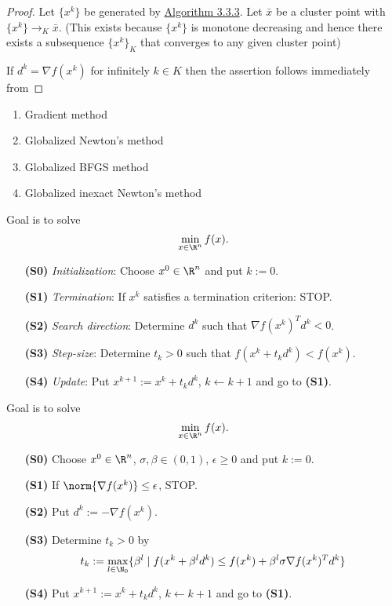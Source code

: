 \begin{proof}

	\def\xk{\{x^k\}}
	\def\grad{\nabla f(x^k)}

	Let $\xk$ be generated by \hyperref[a7a5665]{Algorithm 3.3.3}. Let
	$\bar x$ be a cluster point with $\xk\to_K\bar x$. (This exists
	because $\xk$ is monotone decreasing and hence there exists a
	subsequence $\xk_K$ that converges to any given cluster point)

	If $d^k=\grad$ for infinitely $k\in K$ then the assertion follows immediately from

\end{proof}


\begin{enumerate}
	\item Gradient method
	\item Globalized Newton's method
	\item Globalized BFGS method
	\item Globalized inexact Newton's method
\end{enumerate}


Goal is to solve
$$\min_{x\in\R^n}f(x).$$

\begin{enumerate}
	\item [\textbf{(S0)}] \textit{Initialization}: Choose $x^0\in\R^n$ and put $k:=0$.
	\item [\textbf{(S1)}] \textit{Termination}: If $x^k$ satisfies a termination criterion: STOP.
	\item [\textbf{(S2)}] \textit{Search direction}: Determine $d^k$ such that $\nabla f(x^k)^Td^k<0$.
	\item [\textbf{(S3)}] \textit{Step-size}: Determine $t_k>0$ such that $f(x^k+t_kd^k)<f(x^k)$.
	\item [\textbf{(S4)}] \textit{Update}: Put $x^{k+1}:=x^k+t_kd^k$, $k\gets k+1$ and go to \textbf{(S1)}.
\end{enumerate}

\label{ae01f6d}

Goal is to solve
$$\min_{x\in\R^n}f(x).$$

\begin{enumerate}
	\item [\textbf{(S0)}] Choose $x^0\in\R^n$, $\sigma,\beta\in(0,1)$, $\epsilon\geq0$ and put $k:=0$.
	\item [\textbf{(S1)}] If $\norm{\nabla f(x^k)}\leq\epsilon$, STOP.
	\item [\textbf{(S2)}] Put $d^k:=-\nabla f(x^k)$.
	\item [\textbf{(S3)}] Determine $t_k>0$ by
	      $$t_k:=\max_{l\in\N_0}\{\beta^l\mid f(x^k+\beta^ld^k)\leq f(x^k)+\beta^l\sigma\nabla f(x^k)^Td^k\}$$
	\item [\textbf{(S4)}] Put $x^{k+1}:=x^k+t_kd^k$, $k\gets k+1$ and go to \textbf{(S1)}.
\end{enumerate}

